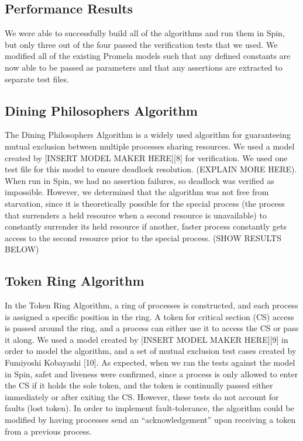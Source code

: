 \documentclass[12pt]{article}
\begin{document}
\begin{flushleft}
\section{Performance Results}
We were able to successfully build all of the algorithms and run them in Spin,
but only three out of the four passed the verification tests that we used. We
modified all of the existing Promela models such that any defined constants are
now able to be passed as parameters and that any assertions are extracted to
separate test files.

\subsection{Dining Philosophers Algorithm}
The Dining Philosophers Algorithm is a widely used algorithm for guaranteeing
mutual exclusion between multiple processes sharing resources. We used a model
created by [INSERT MODEL MAKER HERE][8] for verification. We used one test file
for this model to ensure deadlock resolution. (EXPLAIN MORE HERE). When run in
Spin, we had no assertion failures, so deadlock was verified as
impossible. However, we determined that the algorithm was not free from
starvation, since it is theoretically possible for the special process (the
process that surrenders a held resource when a second resource is unavailable)
to constantly surrender its held resource if another, faster process constantly
gets access to the second resource prior to the special process. (SHOW RESULTS
BELOW)

\subsection{Token Ring Algorithm}
In the Token Ring Algorithm, a ring of processes is constructed, and each
process is assigned a specific position in the ring. A token for critical
section (CS) access is passed around the ring, and a process can either use it
to access the CS or pass it along. We used a model created by [INSERT MODEL
MAKER HERE][9] in order to model the algorithm, and a set of mutual exclusion
test cases created by Fumiyoshi Kobayashi [10]. As expected, when we ran the
tests against the model in Spin, safet and liveness were confirmed, since a
process is only allowed to enter the CS if it holds the sole token, and the
token is continually passed either immediately or after exiting the CS. However,
these tests do not account for faults (lost token). In order to implement
fault-tolerance, the algorithm could be modified by having processes send an
“acknowledgement” upon receiving a token from a previous process.


\end{flushleft}
\end{document}
